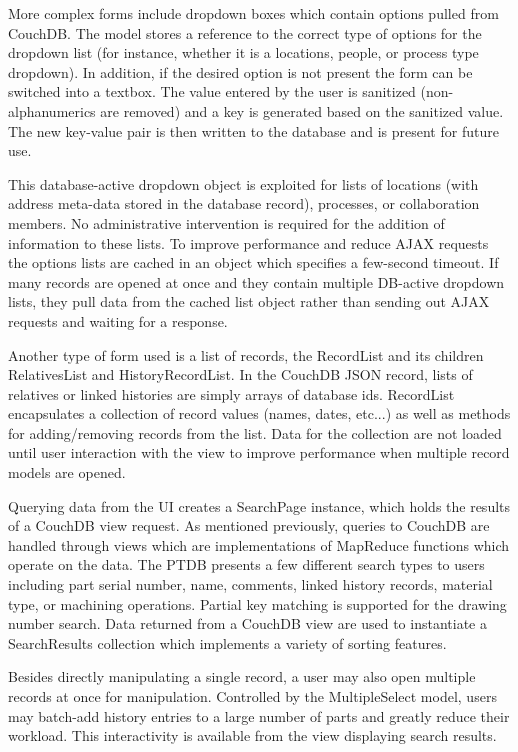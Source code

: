 \documentclass[journal]{IEEEtran}
\begin{document}
More complex forms include dropdown boxes which contain options pulled from CouchDB. The model
stores a reference to the correct type of options for the dropdown list (for instance, whether it is a locations, people,
or process type dropdown). In addition, if the 
desired option is not present the form can be switched into a textbox. The value entered by
the user is sanitized (non-alphanumerics are removed) and a key is generated based on the sanitized value. The new key-value
pair is then written to the database and is present for future use.

This database-active dropdown object is exploited for lists of locations (with address meta-data
stored in the database record), processes, or collaboration members. No administrative intervention
is required for the addition of information to these lists. To improve performance and reduce
AJAX requests the options lists are cached in an object which specifies a few-second timeout.
If many records are opened at once and they contain multiple DB-active dropdown lists, they 
pull data from the cached list object rather than sending out AJAX requests and waiting for 
a response.

Another type of form used is a list of records, the RecordList and its children RelativesList and HistoryRecordList. 
In the CouchDB JSON record, lists of relatives or linked histories are simply arrays of database ids.
RecordList encapsulates a collection of record values (names, dates, etc...)
as well as methods for adding/removing records from the list. Data for the collection are not loaded
until user interaction with the view to improve performance when multiple record models are opened.

Querying data from the UI creates a SearchPage instance, which holds the results of a CouchDB view request.
As mentioned previously, queries to CouchDB are handled through views which are implementations of
MapReduce functions which operate on the data. The PTDB presents a few different search types to users including
part serial number, name, comments, linked history records, material type, or machining operations.
Partial key matching is supported for the drawing number search.
Data returned from a CouchDB view are used to instantiate a SearchResults collection which implements a variety of
sorting features. 

Besides directly manipulating a single record, a user may also open multiple records at once for 
manipulation. Controlled by the MultipleSelect model, users may batch-add history entries to a
large number of parts and greatly reduce their workload. This interactivity is available from
the view displaying search results.
\end{document}
